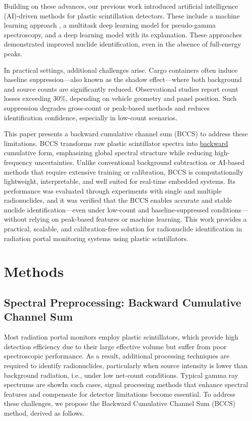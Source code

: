 \documentclass[10pt]{wlscirep}
\begin{document}
Building on these advances, our previous work introduced artificial intelligence (AI)-driven methods for plastic scintillation detectors. These include a machine learning approach \cite{Jeon2021CompML}, a multitask deep learning model for pseudo-gamma spectroscopy\cite{Jeon2021PseudoGamma}, and a deep learning model with its explanation\cite{Jeon2023Explanation}. These approaches demonstrated improved nuclide identification, even in the absence of full-energy peaks. 

In practical settings, additional challenges arise. Cargo containers often induce baseline suppression—also known as the shadow effect—where both background and source counts are significantly reduced. Observational studies report count losses exceeding 30\%, depending on vehicle geometry and panel position\cite{LoPresti2006BaselineSuppression}. Such suppression degrades gross-count or peak-based methods and reduces identification confidence, especially in low-count scenarios. 

This paper presents a backward cumulative channel sum (BCCS) to address these limitations. BCCS transforms raw plastic scintillator spectra into \ul{backward} cumulative form, emphasizing global spectral structure while reducing high-frequency uncertainties. Unlike conventional background subtraction or AI-based methods that require extensive training or calibration, BCCS is computationally lightweight, interpretable, and well suited for real-time embedded systems. Its performance was evaluated through experiments with single and multiple radionuclides, and it was verified that the BCCS enables accurate and stable nuclide identification—even under low-count and baseline-suppressed conditions—without relying on peak-based features or machine learning. This work provides a practical, scalable, and calibration-free solution for radionuclide identification in radiation portal monitoring systems using plastic scintillators.

\section*{Methods}

\subsection*{Spectral Preprocessing: Backward Cumulative Channel Sum}

Most radiation portal monitors employ plastic scintillators, which provide high detection efficiency due to their large effective volume but suffer from poor spectroscopic performance. As a result, additional processing techniques are required to identify radionuclides, particularly when source intensity is lower than background radiation, i.e., under low net-count conditions. Typical gamma ray spectrums are showIn such cases, signal processing methods that enhance spectral features and compensate for detector limitations become essential. To address these challenges, we propose the Backward Cumulative Channel Sum (BCCS) method, derived as follows.
\end{document}
